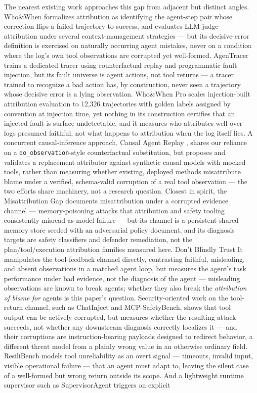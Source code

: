 \documentclass[11pt]{article}
\begin{document}
The nearest existing work approaches this gap from adjacent but distinct angles. Who\&When \citep{WhoWhenGazlTYxZss} formalizes attribution as identifying the agent-step pair whose correction flips a failed trajectory to success, and evaluates LLM-judge attribution under several context-management strategies --- but its decisive-error definition is exercised on naturally occurring agent mistakes, never on a condition where the log's own tool observations are corrupted yet well-formed. AgenTracer \citep{AgenTracerl05DseqvuD} trains a dedicated tracer using counterfactual replay and programmatic fault injection, but its fault universe is agent actions, not tool returns --- a tracer trained to recognize a bad action has, by construction, never seen a trajectory whose decisive error is a lying observation. Who\&When Pro \citep{WhoWhenPro260709996} scales injection-built attribution evaluation to 12,326 trajectories with golden labels assigned by convention at injection time, yet nothing in its construction certifies that an injected fault is surface-undetectable, and it measures who attributes well over logs presumed faithful, not what happens to attribution when the log itself lies. A concurrent causal-inference approach, Causal Agent Replay \citep{CausalAgentReplay260608275}, shares our reliance on a \texttt{do\_observation}-style counterfactual substitution, but proposes and validates a replacement attributor against synthetic causal models with mocked tools, rather than measuring whether existing, deployed methods misattribute blame under a verified, schema-valid corruption of a real tool observation --- the two efforts share machinery, not a research question. Closest in spirit, the Misattribution Gap \citep{MisattributionGap260522842} documents misattribution under a corrupted evidence channel --- memory-poisoning attacks that attribution and safety tooling consistently misread as model failure --- but its channel is a persistent shared memory store seeded with an adversarial policy document, and its diagnosis targets are safety classifiers and defender remediation, not the plan/tool/execution attribution families measured here. Don't Blindly Trust It \citep{DontBlindlyTrust260621409} manipulates the tool-feedback channel directly, contrasting faithful, misleading, and absent observations in a matched agent loop, but measures the agent's task performance under bad evidence, not the diagnosis of the agent --- misleading observations are known to break agents; whether they also break the \emph{attribution of blame for} agents is this paper's question. Security-oriented work on the tool-return channel, such as ChatInject and MCP-SafetyBench, shows that tool output can be actively corrupted, but measures whether the resulting attack succeeds, not whether any downstream diagnosis correctly localizes it --- and their corruptions are instruction-bearing payloads designed to redirect behavior, a different threat model from a plainly wrong value in an otherwise ordinary field. ResiliBench models tool unreliability as an overt signal --- timeouts, invalid input, visible operational failure --- that an agent must adapt to, leaving the silent case of a well-formed but wrong return outside its scope. And a lightweight runtime supervisor such as SupervisorAgent triggers on explicit 
\end{document}
